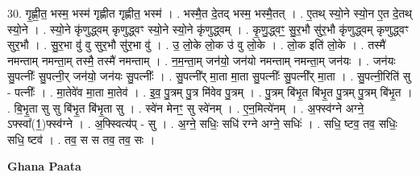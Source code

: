 \documentclass[17pt]{extarticle}
\begin{document}
30. गृ॒ह्णी॒त॒ भस्म॒ भस्म॑ गृह्णीत गृह्णीत॒ भस्म॑ । . भस्मै॒त दे॒तद् भस्म॒ भस्मै॒तत् । . ए॒तथ् स्यो॒ने स्यो॒न ए॒त दे॒तथ् स्यो॒ने । . स्यो॒ने कृ॑णुद्ध्वम् कृणुद्ध्वꣳ स्यो॒ने स्यो॒ने कृ॑णुद्ध्वम् । . कृ॒णु॒द्ध्वꣳ॒॒ सु॒र॒भौ सु॑र॒भौ कृ॑णुद्ध्वम् कृणुद्ध्वꣳ सुर॒भौ । . सु॒र॒भा वु॑ वु सुर॒भौ सु॑र॒भा वु॑ । . उ॒ लो॒के लो॒क उ॑ वु लो॒के । . लो॒क इति॑ लो॒के । . तस्मै॑ नमन्ताम् नमन्ता॒म् तस्मै॒ तस्मै॑ नमन्ताम् । . न॒म॒न्ता॒म् जन॑यो॒ जन॑यो नमन्ताम् नमन्ता॒म् जन॑यः । . जन॑यः सु॒पत्नीः᳚ सु॒पत्नी॒र् जन॑यो॒ जन॑यः सु॒पत्नीः᳚ । . सु॒पत्नी᳚र् मा॒ता मा॒ता सु॒पत्नीः᳚ सु॒पत्नी᳚र् मा॒ता । . सु॒पत्नी॒रिति॑ सु - पत्नीः᳚ । . मा॒तेवे॑व मा॒ता मा॒तेव॑ । . इ॒व॒ पु॒त्रम् पु॒त्र मि॑वेव पु॒त्रम् । . पु॒त्रम् बि॑भृ॒त बि॑भृ॒त पु॒त्रम् पु॒त्रम् बि॑भृ॒त । . बि॒भृ॒ता सु सु बि॑भृ॒त बि॑भृ॒ता सु । . स्वे॑न मेनꣳ॒॒ सु स्वे॑नम् । . ए॒न॒मित्ये॑नम् । . अ॒फ्स्व॑ग्ने अग्ने॒ ऽफ्स्वा᳚(1॒)फ्स्व॑ग्ने । . अ॒फ्स्वित्य॑प् - सु । . अ॒ग्ने॒ सधिः॒ सधि॑ रग्ने अग्ने॒ सधिः॑ । . सधि॒ ष्टव॒ तव॒ सधिः॒ सधि॒ ष्टव॑ । . तव॒ स स तव॒ तव॒ सः । \newline

\textbf{Ghana Paata } \newline
\end{document}
